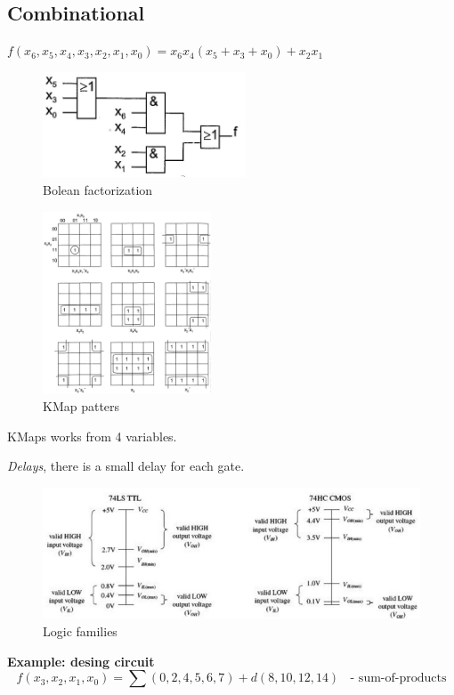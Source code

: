 \documentclass{article}
\begin{document}
\newpage
\subsection{Combinational}
$f(x_6,x_5,x_4,x_3,x_2,x_1,x_0) = x_6x_4(x_5+x_3+x_0) + x_2x_1$
\begin{figure}[h]
    \centering
    \includegraphics[width=6cm]{image/bolean-factorization.png}
    \caption{Bolean factorization}
\end{figure}

\begin{figure}[h]
    \centering
    \includegraphics[width=5cm]{image/kmap-patterns.png}
    \caption{KMap patters}
\end{figure}
KMaps works from 4 variables.

\textit{Delays}, there is a small delay for each gate.

%

\begin{figure}[h]
    \centering
    \includegraphics[width=12cm]{image/logic-families.png}
    \caption{Logic families}
\end{figure}

\newpage
\textbf{Example: desing circuit}
\begin{equation}
    f(x_3,x_2,x_1,x_0) = \sum(0,2,4,5,6,7) + d(8,10,12,14) \;\; \text{ - sum-of-products}
\end{equation}
\end{document}
